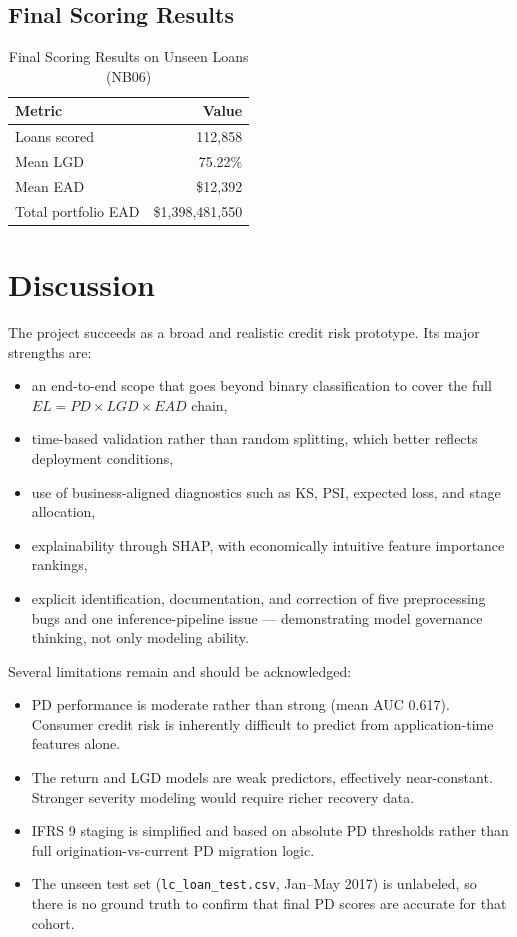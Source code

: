 \documentclass[12pt]{article}
\begin{document}
\subsection{Final Scoring Results}

\begin{table}[H]
\centering
\caption{Final Scoring Results on Unseen Loans (NB06)}
\begin{tabular}{lr}
\toprule
Metric & Value \\
\midrule
Loans scored & 112,858 \\
Mean LGD & 75.22\% \\
Mean EAD & \$12,392 \\
Total portfolio EAD & \$1,398,481,550 \\
\bottomrule
\end{tabular}
\end{table}

\section{Discussion}

The project succeeds as a broad and realistic credit risk prototype. Its major strengths are:

\begin{itemize}[leftmargin=1.5em]
    \item an end-to-end scope that goes beyond binary classification to cover the full $EL = PD \times LGD \times EAD$ chain,
    \item time-based validation rather than random splitting, which better reflects deployment conditions,
    \item use of business-aligned diagnostics such as KS, PSI, expected loss, and stage allocation,
    \item explainability through SHAP, with economically intuitive feature importance rankings,
    \item explicit identification, documentation, and correction of five preprocessing bugs and one inference-pipeline issue --- demonstrating model governance thinking, not only modeling ability.
\end{itemize}

Several limitations remain and should be acknowledged:

\begin{itemize}[leftmargin=1.5em]
    \item PD performance is moderate rather than strong (mean AUC 0.617). Consumer credit risk is inherently difficult to predict from application-time features alone.
    \item The return and LGD models are weak predictors, effectively near-constant. Stronger severity modeling would require richer recovery data.
    \item IFRS 9 staging is simplified and based on absolute PD thresholds rather than full origination-vs-current PD migration logic.
    \item The unseen test set (\texttt{lc\_loan\_test.csv}, Jan--May 2017) is unlabeled, so there is no ground truth to confirm that final PD scores are accurate for that cohort.
\end{itemize}
\end{document}
